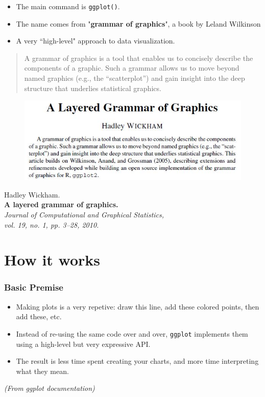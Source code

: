 \documentclass{beamer}
\begin{document}
\begin{frame}[fragile]
\Large
\begin{itemize}
\item The main command is \texttt{ggplot()}.
\item The name comes from "\textbf{grammar of graphics}", a book by Leland Wilkinson
\item A very ``high-level" approach to data visualization.
\end{itemize}
\begin{framed}
\begin{quote}
	A grammar of graphics is a tool that enables us to concisely describe the components
	of a graphic. Such a grammar allows us to move beyond named graphics (e.g., the “scatterplot”)
	and gain insight into the deep structure that underlies statistical graphics.
\end{quote}
\end{framed}
\end{frame}

\begin{frame}

\begin{figure}
\centering
\includegraphics[width=1.1\linewidth]{HWpaper}
\end{figure}
\begin{framed}
Hadley Wickham.\\
\textbf{A layered grammar of graphics.}\\
\textit{Journal of Computational and Graphical Statistics, \\ vol. 19, no. 1, pp. 3–28, 2010.}
\end{framed}

\end{frame}

\section{How it works}
\begin{frame}[fragile]
	\Large
	\frametitle{Basic Premise}

	\begin{itemize}
		\item Making plots is a very repetive: draw this line, add these colored points, then add these, etc. 
		\item Instead of re-using the same code over and over, \texttt{ggplot} implements them using a high-level but very expressive API.
		\item The result is less time spent creating your charts, and more time interpreting what they mean.
	\end{itemize}
\textit{(From ggplot documentation)}	
\end{frame}
\end{document}
